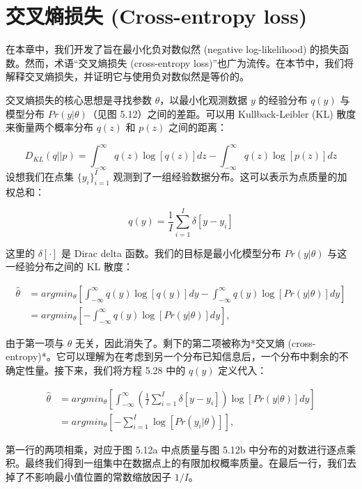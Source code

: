\section{交叉熵损失 (Cross-entropy loss)}

在本章中，我们开发了旨在最小化负对数似然 (negative log-likelihood) 的损失函数。然而，术语“交叉熵损失 (cross-entropy loss)”也广为流传。在本节中，我们将解释交叉熵损失，并证明它与使用负对数似然是等价的。

交叉熵损失的核心思想是寻找参数 \(\theta\)，以最小化观测数据 \(y\) 的经验分布 \(q(y)\) 与模型分布 \(Pr(y|\theta)\)（见图 5.12）之间的差距。可以用 Kullback-Leibler (KL) 散度来衡量两个概率分布 \(q(z)\) 和 \(p(z)\) 之间的距离：

\begin{equation}
D_{KL}(q||p) = \int_{-\infty}^{\infty} q(z) \log [q(z)] dz - \int_{-\infty}^{\infty} q(z) \log [p(z)] dz 
\end{equation}
设想我们在点集 \(\{y_i\}^I_{i=1}\) 观测到了一组经验数据分布。这可以表示为点质量的加权总和：

\begin{equation}
q(y) = \frac{1}{I} \sum_{i=1}^{I} \delta[y - y_i] 
\end{equation}

这里的 \(\delta[\cdot]\) 是 Dirac delta 函数。我们的目标是最小化模型分布 \(Pr(y|\theta)\) 与这一经验分布之间的 KL 散度：


\begin{align}
	\hat{\theta} &= argmin_{\theta} \left[ \int_{-\infty}^{\infty} q(y) \log [q(y)] dy - \int_{-\infty}^{\infty} q(y) \log [Pr(y|\theta)] dy \right] \\
	&= argmin_{\theta} \left[ -\int_{-\infty}^{\infty} q(y) \log [Pr(y|\theta)] dy \right], 
\end{align}


由于第一项与 \(\theta\) 无关，因此消失了。剩下的第二项被称为*交叉熵 (cross-entropy)*。它可以理解为在考虑到另一个分布已知信息后，一个分布中剩余的不确定性量。接下来，我们将方程 5.28 中的 \(q(y)\) 定义代入：


\begin{align}
	\hat{\theta} &= argmin_{\theta} \left[ \int_{-\infty}^{\infty} \left( \frac{1}{I} \sum_{i=1}^{I} \delta[y - y_i] \right) \log [Pr(y|\theta)] dy \right] \\
	&= argmin_{\theta} \left[ -\sum_{i=1}^{I} \log [Pr(y_i|\theta)] \right], 
\end{align} 


第一行的两项相乘，对应于图 5.12a 中点质量与图 5.12b 中分布的对数进行逐点乘积。最终我们得到一组集中在数据点上的有限加权概率质量。在最后一行，我们去掉了不影响最小值位置的常数缩放因子 \(1/I\)。

